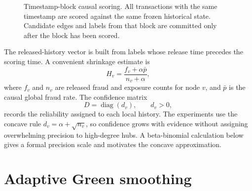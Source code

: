 \documentclass[11pt]{article}
\theoremstyle{definition}
\theoremstyle{remark}
\newcommand{\diag}{\operatorname{diag}}
\begin{document}
\begin{figure}[t]
\centering
{}
\caption{Timestamp-block causal scoring. All transactions with the same timestamp are scored against the same frozen historical state. Candidate edges and labels from that block are committed only after the block has been scored.}
\label{fig:graph}
\end{figure}

The released-history vector is built from labels whose release time precedes the scoring time. A convenient shrinkage estimate is
\begin{equation}
    H_v=\frac{f_v+\alpha \bar p}{n_v+\alpha},
    \label{eq:history}
\end{equation}
where $f_v$ and $n_v$ are released fraud and exposure counts for node $v$, and $\bar p$ is the causal global fraud rate. The confidence matrix
\[
    D=\diag(d_v),\qquad d_v>0,
\]
records the reliability assigned to each local history. The experiments use the concave rule $d_v=\alpha+\sqrt{n_v}$, so confidence grows with evidence without assigning overwhelming precision to high-degree hubs. A beta-binomial calculation below gives a formal precision scale and motivates the concave approximation.

\section{Adaptive Green smoothing}
\label{sec:theory}
\end{document}
